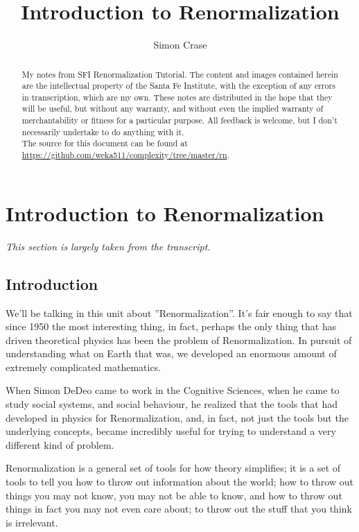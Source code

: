 \documentclass[]{article}
\title{Introduction to Renormalization}
\author{Simon Crase}
\begin{document}
\maketitle

\begin{abstract}
My notes from SFI Renormalization Tutorial\cite{dedeo2017renormalization}.
The content and images contained herein are the intellectual property of the Santa Fe Institute, with the exception of any errors in transcription, which are my own. These notes are distributed in the hope that they will be useful,  but without any warranty, and without even the implied warranty of merchantability or fitness for a particular purpose. All feedback is welcome,  but I don't necessarily undertake to do anything with it.\\
The source for this document can be found at\\
\url{https://github.com/weka511/complexity/tree/master/rn}.
\end{abstract}

\tableofcontents
\listoffigures
\listoftables
{}

\section{Introduction to Renormalization}

\textit{This section is largely taken from the transcript.}

\subsection{Introduction}

We'll be talking in this unit about ''Renormalization''. It's fair enough to say that since 1950 the most interesting thing, in fact, perhaps the only thing that has driven theoretical physics has been the problem of Renormalization. In pursuit of understanding what on Earth that was, we developed an enormous amount of extremely complicated mathematics.

When Simon DeDeo came to work in the Cognitive Sciences, when he came to study social systems, and social behaviour,  he realized  that the tools that had developed in physics for Renormalization, and, in fact, not just the tools but the underlying concepts, became incredibly useful for trying to understand a very different kind of problem.

Renormalization is a general set of tools for how theory simplifies; it is a set of tools to tell you how to throw out information about the world; how to throw out things you may not know, you may not be able to know, and how to throw out 
things in fact you may not even care about; to throw out the stuff that you think is irrelevant.
\end{document}
